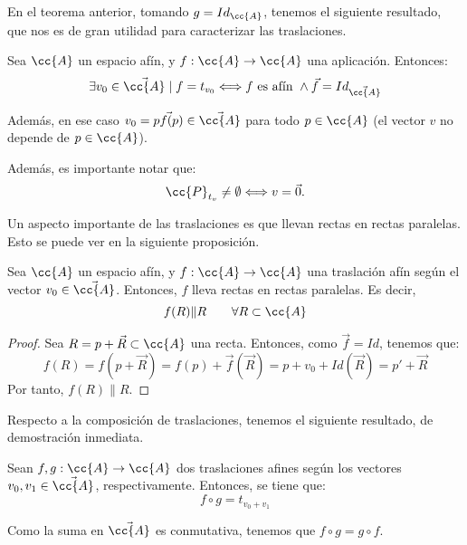 En el teorema anterior, tomando $g=Id_{\cc{A}}$, tenemos el siguiente resultado, que nos es de gran utilidad para caracterizar las traslaciones.
\begin{coro}
    Sea $\cc{A}$ un espacio afín, y $f:\cc{A}\to \cc{A}$ una aplicación. Entonces:
    \begin{equation*}
        \exists v_0\in \vec{\cc{A}}\mid f=t_{v_0} \Longleftrightarrow f\text{ es afín }\land \vec{f}=Id_{\vec{\cc{A}}} 
    \end{equation*}

    Además, en ese caso $v_0=\vec{pf(p)}\in \vec{\cc{A}}$ para todo $p\in \cc{A}$ (el vector $v$ no depende de $p\in \cc{A}$).
\end{coro}

Además, es importante notar que:
\begin{equation*}
    \cc{P}_{t_v}\neq \emptyset \Longleftrightarrow v=\vec{0}.
\end{equation*}

Un aspecto importante de las traslaciones es que llevan rectas en rectas paralelas. Esto se puede ver en la siguiente proposición.
\begin{prop}
    Sea $\cc{A}$ un espacio afín, y $f:\cc{A}\to \cc{A}$ una traslación afín según el vector $v_0\in \vec{\cc{A}}$. Entonces, $f$ lleva rectas en rectas paralelas. Es decir,
    \begin{equation*}
        f(R)\| R \qquad \forall R\subset \cc{A}
    \end{equation*}
\end{prop}
\begin{proof}
    Sea $R=p+\vec{R}\subset \cc{A}$ una recta. Entonces, como $\vec{f}=Id$, tenemos que:
    \begin{equation*}
        f(R) = f(p+\vec{R}) = f(p) + \vec{f}(\vec{R}) = p+v_0 + Id(\vec{R}) = p' + \vec{R}
    \end{equation*}
    Por tanto, $f(R)\| R$.
\end{proof}

Respecto a la composición de traslaciones, tenemos el siguiente resultado, de demostración inmediata.
\begin{prop}
    Sean $f,g:\cc{A}\to \cc{A}$ dos traslaciones afines según los vectores $v_0,v_1\in \vec{\cc{A}}$, respectivamente. Entonces, se tiene que:
    \begin{equation*}
        f\circ g = t_{v_0+v_1}
    \end{equation*}
\end{prop}
Como la suma en $\vec{\cc{A}}$ es conmutativa, tenemos que $f\circ g = g\circ f$.

